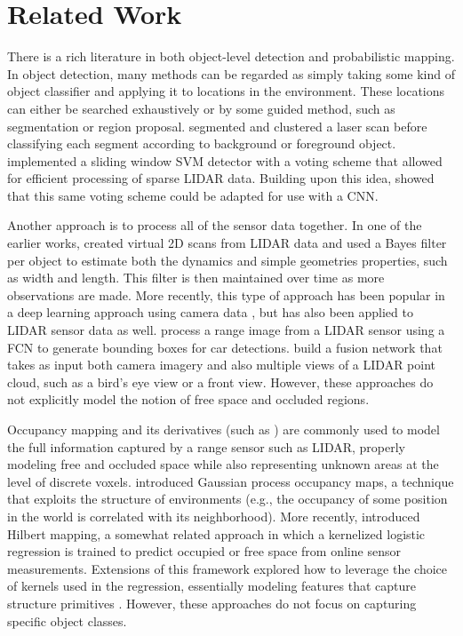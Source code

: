 \section{Related Work}\label{sec:rw}

There is a rich literature in both object-level detection and probabilistic
mapping. In object detection, many methods can be regarded as simply taking some
kind of object classifier and applying it to locations in the environment. These
locations can either be searched exhaustively or by some guided method, such as
segmentation or region proposal. \citet{wang2012could} segmented and clustered a
laser scan before classifying each segment according to background or foreground
object. \citet{wang2015RSS} implemented a sliding window SVM detector with a
voting scheme that allowed for efficient processing of sparse \ac{LIDAR} data.
Building upon this idea, \citet{Engelcke2017ICRA} showed that this same voting
scheme could be adapted for use with a \ac{CNN}.

Another approach is to process all of the sensor data together. In one of the
earlier works, \citet{petrovskaya-2009} created virtual 2D scans from \ac{LIDAR}
data and used a Bayes filter per object to estimate both the dynamics and simple
geometries properties, such as width and length. This filter is then maintained
over time as more observations are made. More recently, this type of approach has
been popular in a deep learning approach using camera data
\citep{yang2016exploit, deepmanta_cvpr17, Ren17CVPR}, but has also been applied
to \ac{LIDAR} sensor data as well. \citet{Li2016RSS} process a range image from
a \ac{LIDAR} sensor using a \ac{FCN} to generate bounding boxes for car
detections. \citet{Chen2017CVPR} build a fusion network that takes as input both
camera imagery and also multiple views of a \ac{LIDAR} point cloud, such as a
bird's eye view or a front view. However, these approaches do not explicitly model
the notion of free space and occluded regions.

Occupancy mapping \cite{thrun2005probabilistic} and its derivatives (such as
\cite{hornung13auro}) are commonly used to model the full
information captured by a range sensor such as \ac{LIDAR}, properly modeling
free and occluded space while also representing unknown areas at the level of discrete
voxels. \citet{gpmaps_ijrr12} introduced Gaussian process occupancy maps, a
technique that exploits the structure of environments (e.g., the occupancy of
some position in the world is correlated with its neighborhood). More recently,
\citet{Ramos-RSS-15} introduced Hilbert mapping, a somewhat related approach in
which a kernelized logistic regression is trained to predict occupied or free
space from online sensor measurements. Extensions of this framework explored how
to leverage the choice of kernels used in the regression, essentially modeling
features that capture structure primitives \citep{Guizilini-RSS-17,
  guizilini2016large}. However, these approaches do not focus on capturing
specific object classes.

